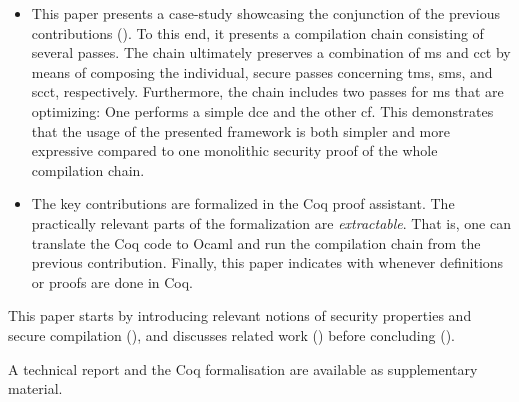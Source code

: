 \documentclass[utf8,acmsmall,review,screen,dvipsnames]{acmart}
\begin{document}
\begin{itemize}
  \item %
        This paper presents a case-study showcasing the conjunction of the previous contributions ().
        To this end, it presents a compilation chain consisting of several passes.
        The chain ultimately preserves a combination of \gls{ms} and \gls{cct} by means of composing the individual, secure passes concerning \gls{tms}, \gls{sms}, and \gls{scct}, respectively.
        Furthermore, the chain includes two passes for \gls{ms} that are optimizing: One performs a simple \gls{dce} and the other \gls{cf}.
        This demonstrates that the usage of the presented framework is both simpler and more expressive compared to one monolithic security proof of the whole compilation chain.

  \item The key contributions are formalized in the Coq proof assistant.
        The practically relevant parts of the formalization are \emph{extractable}.
        That is, one can translate the Coq code to Ocaml and run the compilation chain from the previous contribution.
        Finally, this paper indicates with \CoqSymbol whenever definitions or proofs are done in Coq.
\end{itemize}

This paper starts by introducing relevant notions of security properties and secure compilation (),
and discusses related work () before concluding ().

 A technical report and the Coq formalisation are available as supplementary material.
\end{document}
